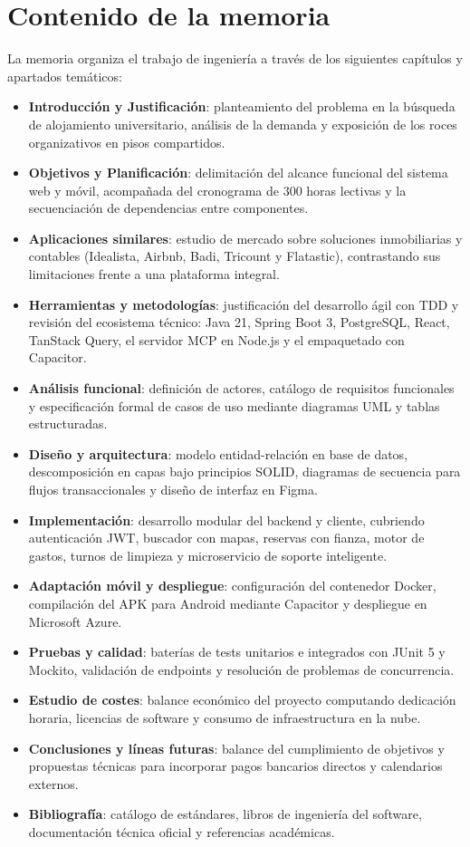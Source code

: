 \section{Contenido de la memoria}
\label{Contenido de la memoria}

    La memoria organiza el trabajo de ingeniería a través de los siguientes capítulos y apartados temáticos:

\begin{itemize}
    \item \textbf{Introducción y Justificación}: planteamiento del problema en la búsqueda de alojamiento universitario, análisis de la demanda y exposición de los roces organizativos en pisos compartidos.
    \item \textbf{Objetivos y Planificación}: delimitación del alcance funcional del sistema web y móvil, acompañada del cronograma de 300 horas lectivas y la secuenciación de dependencias entre componentes.
    \item \textbf{Aplicaciones similares}: estudio de mercado sobre soluciones inmobiliarias y contables (Idealista, Airbnb, Badi, Tricount y Flatastic), contrastando sus limitaciones frente a una plataforma integral.
    \item \textbf{Herramientas y metodologías}: justificación del desarrollo ágil con TDD y revisión del ecosistema técnico: Java 21, Spring Boot 3, PostgreSQL, React, TanStack Query, el servidor MCP en Node.js y el empaquetado con Capacitor.
    \item \textbf{Análisis funcional}: definición de actores, catálogo de requisitos funcionales y especificación formal de casos de uso mediante diagramas UML y tablas estructuradas.
    \item \textbf{Diseño y arquitectura}: modelo entidad-relación en base de datos, descomposición en capas bajo principios SOLID, diagramas de secuencia para flujos transaccionales y diseño de interfaz en Figma.
    \item \textbf{Implementación}: desarrollo modular del backend y cliente, cubriendo autenticación JWT, buscador con mapas, reservas con fianza, motor de gastos, turnos de limpieza y microservicio de soporte inteligente.
    \item \textbf{Adaptación móvil y despliegue}: configuración del contenedor Docker, compilación del APK para Android mediante Capacitor y despliegue en Microsoft Azure.
    \item \textbf{Pruebas y calidad}: baterías de tests unitarios e integrados con JUnit 5 y Mockito, validación de endpoints y resolución de problemas de concurrencia.
    \item \textbf{Estudio de costes}: balance económico del proyecto computando dedicación horaria, licencias de software y consumo de infraestructura en la nube.
    \item \textbf{Conclusiones y líneas futuras}: balance del cumplimiento de objetivos y propuestas técnicas para incorporar pagos bancarios directos y calendarios externos.
    \item \textbf{Bibliografía}: catálogo de estándares, libros de ingeniería del software, documentación técnica oficial y referencias académicas.
\end{itemize}